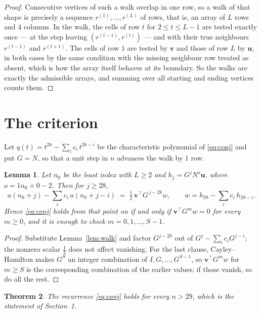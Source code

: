\documentclass[11pt,a4paper]{article}
\theoremstyle{plain}
\newtheorem{theorem}{Theorem}
\newtheorem{lemma}[theorem]{Lemma}
\theoremstyle{definition}
\begin{document}
\begin{proof}
Consecutive vertices of such a walk overlap in one row, so a walk of that shape is
precisely a sequence $r^{(1)},\dots,r^{(L)}$ of rows, that is, an array of $L$ rows
and $4$ columns. In the walk, the cells of row $t$ for $2\le t\le L-1$ are tested
exactly once --- at the step leaving $(r^{(t-1)},r^{(t)})$ --- and with their true
neighbours $r^{(t-1)}$ and $r^{(t+1)}$. The cells of row $1$ are tested by
$\mathbf{v}$ and those of row $L$ by $\mathbf{u}$, in both cases by the same condition
with the missing neighbour row treated as absent, which is how the array itself behaves at
its boundary. So the walks are exactly the admissible arrays, and summing over all starting
and ending vertices counts them.
\end{proof}

\section{The criterion}

Let $q(t)=t^{28}-\sum_i c_i\,t^{28-i}$ be the characteristic polynomial of
\eqref{eq:conj} and put $G=N$, so that a unit step in $n$ advances the walk by
$1$ row.

\begin{lemma}\label{lem:crit}
Let $n_0$ be the least index with $L\ge2$ and $h_j=G^{j}N^{o}\mathbf{u}$, where
$o=1n_0+0-2$. Then for $j\ge28$,
\[
a(n_0+j)-\sum_i c_i\,a(n_0+j-i)\;=\;\tfrac1{2}\,\mathbf{v}^{\!\top}G^{\,j-28}w,
\qquad w=h_{28}-\sum_i c_i\,h_{28-i} .
\]
Hence \eqref{eq:conj} holds from that point on if and only if
$\mathbf{v}^{\!\top}G^{m}w=0$ for every $m\ge0$, and it is enough to check
$m=0,1,\dots,S-1$.
\end{lemma}

\begin{proof}
Substitute Lemma~\ref{lem:walk} and factor $G^{j-28}$ out of
$G^{j}-\sum_ic_iG^{j-i}$; the nonzero scalar $\tfrac1{2}$ does not affect
vanishing. For the last clause, Cayley--Hamilton makes $G^{S}$ an integer combination of
$I,G,\dots,G^{S-1}$, so $\mathbf{v}^{\!\top}G^{m}w$ for $m\ge S$ is the corresponding
combination of the earlier values; if those vanish, so do all the rest.
\end{proof}

\begin{theorem}
The recurrence \eqref{eq:conj} holds for every $n>29$, which is the statement of
Section~1.
\end{theorem}
\end{document}
